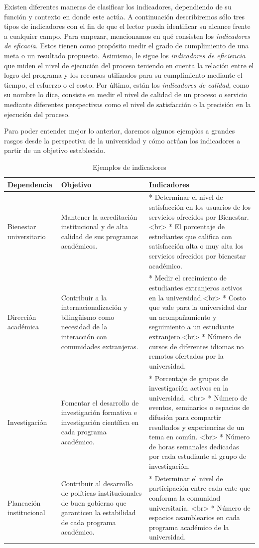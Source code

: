 \documentclass[
]{book}
\begin{document}
Existen diferentes maneras de clasificar los indicadores, dependiendo de su función y contexto en donde este actúa. A continuación describiremos sólo tres tipos de indicadores con el fin de que el lector pueda identificar su alcance frente a cualquier campo. Para empezar, mencionamos en qué consisten los \emph{indicadores de eficacia}. Estos tienen como propósito medir el grado de cumplimiento de una meta o un resultado propuesto. Asimismo, le sigue los \emph{indicadores de eficiencia} que miden el nivel de ejecución del proceso teniendo en cuenta la relación entre el logro del programa y los recursos utilizados para su cumplimiento mediante el tiempo, el esfuerzo o el costo. Por último, están los \emph{indicadores de calidad}, como su nombre lo dice, consiste en medir el nivel de calidad de un proceso o servicio mediante diferentes perspectivas como el nivel de satisfacción o la precisión en la ejecución del proceso.

Para poder entender mejor lo anterior, daremos algunos ejemplos a grandes rasgos desde la perspectiva de la universidad y cómo actúan los indicadores a partir de un objetivo establecido.

\begin{table}

\caption{\label{tab:unnamed-chunk-2}Ejemplos de indicadores}
\centering
\begin{tabular}[t]{l|l|l}
\hline
Dependencia & Objetivo & Indicadores\\
\hline
Bienestar universitario & Mantener la acreditación institucional y de alta calidad de sus programas académicos. & * Determinar el nivel de satisfacción en los usuarios de los servicios ofrecidos por Bienestar. <br> * El porcentaje  de estudiantes que califica con satisfacción alta o muy alta los servicios ofrecidos por bienestar académico.\\
\hline
Dirección académica & Contribuir a la internacionalización y bilingüismo como necesidad de la interacción con comunidades extranjeras. & * Medir el crecimiento de estudiantes extranjeros activos en la universidad.<br> * Costo que vale para la universidad dar un acompañamiento y seguimiento a un estudiante extranjero.<br> * Número de cursos de diferentes  idiomas no remotos ofertados por la universidad.\\
\hline
Investigación & Fomentar el desarrollo de investigación formativa e investigación científica en cada programa académico. & * Porcentaje de grupos de investigación activos en la universidad. <br> * Número de eventos, seminarios o espacios de difusión para compartir resultados y experiencias de un tema en común. <br> * Número de horas semanales dedicadas por cada estudiante al grupo de investigación.\\
\hline
Planeación institucional & Contribuir al desarrollo de políticas institucionales de buen gobierno que garanticen la estabilidad de cada programa académico. & * Determinar el nivel de participación entre cada ente que conforma la comunidad universitaria. <br> * Número de espacios asamblearios en cada programa académico de la universidad.\\
\hline
\end{tabular}
\end{table}
\end{document}
